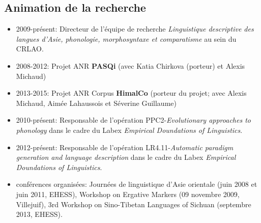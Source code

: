 \documentclass[oldfontcommands,oneside,a4paper,11pt]{article}
\begin{document}
\subsection*{Animation de la recherche}
\begin{itemize}
\item 2009-présent: Directeur de l'équipe de recherche \textit{Linguistique descriptive des langues d’Asie, phonologie, morphosyntaxe et comparatisme} au sein du CRLAO.
\item 2008-2012: Projet ANR \textbf{PASQi} (avec Katia Chirkova (porteur) et Alexis Michaud)
\item  2013-2015: Projet ANR Corpus \textbf{HimalCo} (porteur du projet; avec Alexis Michaud, Aimée Lahaussois et Séverine Guillaume)
\item 2010-présent: Responsable de l'opération PPC2-\textit{Evolutionary approaches to phonology} dans le cadre du Labex \textit{Empirical Doundations of Linguistics}.
\item 2012-présent: Responsable de l'opération LR4.11-\textit{Automatic paradigm generation and language description} dans le cadre du Labex \textit{Empirical Doundations of Linguistics}.
\item conférences organisées: Journées de linguistique d'Asie orientale (juin 2008 et juin 2011, EHESS),  Workshop on Ergative Markers (09 novembre 2009, Villejuif), 3rd Workshop on Sino-Tibetan Languages of Sichuan (septembre 2013, EHESS).
\end{itemize}
  
\end{document}
